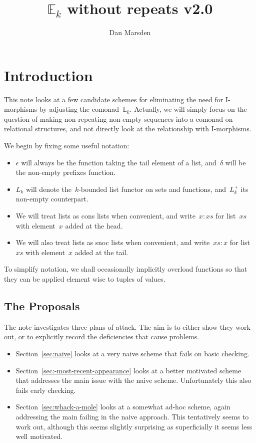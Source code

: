 \documentclass{article}
\title{$\mathbb{E}_k$ without repeats v2.0}
\author{Dan Marsden}
\theoremstyle{plain}
\theoremstyle{definition}
\theoremstyle{remark}
\numberwithin{theorem}{section}
\begin{document}
\maketitle

\section{Introduction}
This note looks at a few candidate schemes for eliminating the need for I-morphisms by adjusting the comonad~$\mathbb{E}_k$. Actually, we will simply focus on the question of making non-repeating non-empty sequences into a comonad on relational structures, and not directly look at the relationship with I-morphisms.

We begin by fixing some useful notation:
\begin{itemize}
    \item $\epsilon$ will always be the function taking the tail element of a list, and~$\delta$ will be the non-empty prefixes function.
    \item $L_k$ will denote the~$k$-bounded list functor on sets and functions, and~$L^+_k$ its non-empty counterpart.
    \item We will treat lists as cons lists when convenient, and write~$x:xs$ for list~$xs$ with element~$x$ added at the head.
    \item We will also treat lists as snoc lists when convenient, and write~$xs:x$ for list~$xs$ with element~$x$ added at the tail.
\end{itemize}
To simplify notation, we shall occasionally implicitly overload functions so that they can be applied element wise to tuples of values.

\subsection*{The Proposals}
The note investigates three plans of attack. The aim is to either show they work out, or to explicitly record the deficiencies that cause problems.
\begin{itemize}
    \item Section~\ref{sec:naive} looks at a very naive scheme that fails on basic checking.
    \item Section~\ref{sec:-most-recent-appearance} looks at a better motivated scheme that addresses the main issue with the naive scheme. Unfortunately this also fails early checking.
    \item Section~\ref{sec:whack-a-mole} looks at a somewhat ad-hoc scheme, again addressing the main failing in the naive approach. This tentatively seems to work out, although this seems slightly surprising as superficially it seems less well motivated.
\end{itemize}
\end{document}
